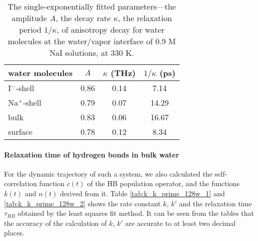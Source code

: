 {\begin{table}[H]
\centering
\caption{\label{tab:c2_single-exp-fitting_NaI}%
	The single-exponentially fitted parameters---the amplitude $A$, the decay rate $\kappa$, the relaxation period $1/\kappa$, of anisotropy decay for water molecules 
	at the water/vapor interface of 0.9 M NaI solutions, at 330 K.} 
\begin{tabular}{lccc}
	water molecules &  $A$ & $\kappa$ (THz) & $1/\kappa$ (ps)  \\
\hline
	I$^-$-shell  & 0.86  & 0.14  & 7.14 \\
	Na$^+$-shell & 0.79 & 0.07  & 14.29 \\
	bulk & 0.83 & 0.06  & 16.67 \\
	surface & 0.78 & 0.12 & 8.34 \\
\end{tabular}
\end{table}

\paragraph{Relaxation time of hydrogen bonds in bulk water}\label{rate_const_and_tau_R_128w}
% 
For the dynamic trajectory of such a system, we also calculated the self-correlation function $c(t)$ of the HB population operator, 
and the functions $k(t)$ and $n(t)$ derived from it. 
Table \ref{tab:k_k_prime_128w_1} and \ref{tab:k_k_prime_128w_2} shows the rate constant $k$, $k'$ and 
the relaxation time $\tau_{HB}$ obtained by the least squares fit method. 
It can be seen from the tables that the accuracy of the calculation of $k$, $k'$ are accurate to at least two decimal places.

}
